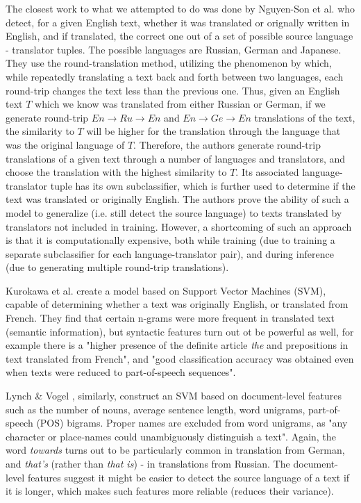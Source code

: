 \documentclass[twocolumn]{article}
\begin{document}
The closest work to what we attempted to do was done by Nguyen-Son et al. \cite{roundtrip} who detect, for a given English text, whether it was translated or orignally written in English, and if translated, the correct one out of a set of possible source language - translator tuples. The possible languages are Russian, German and Japanese. They use the round-translation method, utilizing the phenomenon by which, while repeatedly translating a text back and forth between two languages, each round-trip changes the text less than the previous one. Thus, given an English text $T$ which we know was translated from either Russian or German, if we generate round-trip $En \rightarrow Ru \rightarrow En$ and $En \rightarrow Ge \rightarrow En$ translations of the text, the similarity to $T$ will be higher for the translation through the language that was the original language of $T$. Therefore, the authors generate round-trip translations of a given text through a number of languages and translators, and choose the translation with the highest similarity to $T$. Its associated language-translator tuple has its own subclassifier, which is further used to determine if the text was translated or originally English. The authors prove the ability of such a model to generalize (i.e. still detect the source language) to texts translated by translators not included in training. However, a shortcoming of such an approach is that it is computationally expensive, both while training (due to training a separate subclassifier for each language-translator pair), and during inference (due to generating multiple round-trip translations).

Kurokawa et al. \cite{canada} create a model based on Support Vector Machines (SVM), capable of determining whether a text was originally English, or translated from French. They find that certain n-grams were more frequent in translated text (semantic information), but syntactic features turn out ot be powerful as well, for example there is a "higher presence of the definite article \emph{the} and prepositions in text translated from French", and "good classification accuracy was obtained even when texts were reduced to part-of-speech sequences".

Lynch \& Vogel \cite{literary}, similarly, construct an SVM based on document-level features such as the number of nouns, average sentence length, word unigrams, part-of-speech (POS) bigrams. Proper names are excluded from word unigrams, as "any character or place-names could unambiguously distinguish a text". Again, the word \emph{towards} turns out to be particularly common in translation from German, and \emph{that's} (rather than \emph{that is}) - in translations from Russian. The document-level features suggest it might be easier to detect the source language of a text if it is longer, which makes such features more reliable (reduces their variance).
\end{document}
